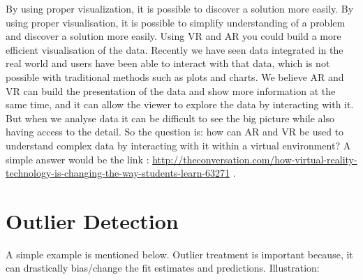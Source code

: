 \documentclass[]{book}
\theoremstyle{definition}
\theoremstyle{definition}
\theoremstyle{definition}
\theoremstyle{remark}
\begin{document}
By using proper visualization, it is possible to discover a solution
more easily. By using proper visualisation, it is possible to simplify
understanding of a problem and discover a solution more easily. Using VR
and AR you could build a more efficient visualisation of the data.
Recently we have seen data integrated in the real world and users have
been able to interact with that data, which is not possible with
traditional methods such as plots and charts. We believe AR and VR can
build the presentation of the data and show more information at the same
time, and it can allow the viewer to explore the data by interacting
with it. But when we analyse data it can be difficult to see the big
picture while also having access to the detail. So the question is: how
can AR and VR be used to understand complex data by interacting with it
within a virtual environment? A simple answer would be the link :
\url{http://theconversation.com/how-virtual-reality-technology-is-changing-the-way-students-learn-63271}
.

\section{Outlier Detection}\label{outlier-detection}

A simple example is mentioned below. Outlier treatment is important
because, it can drastically bias/change the fit estimates and
predictions. Illustration:
\end{document}
